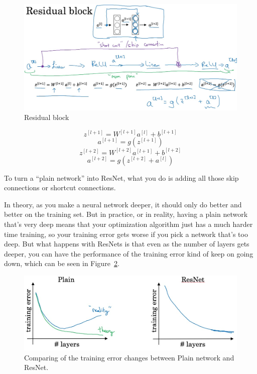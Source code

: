 \documentclass[UTF8]{article}
\newcommand{\Vector}[1]{\boldsymbol{\mathit{#1}}}   %
\newcommand{\Matrix}[1]{\boldsymbol{\mathit{#1}}}   %
\begin{document}
\begin{figure}[htb]
    \centering
    \includegraphics[width=40em]{figures/residual-block}
    \caption{Residual block}
    \label{fig:residual-block}
\end{figure}

$$ \Vector{z}^{[l+1]} = \Matrix{W}^{[l+1]} \Vector{a}^{[l]} + b^{[l+1]} $$
$$ \Vector{a}^{[l+1]} = g(\Vector{z^{[l+1]}}) $$
$$ \Vector{z}^{[l+2]} = \Matrix{W}^{[l+2]} \Vector{a}^{[l+1]} + b^{[l+2]} $$
$$ \Vector{a}^{[l+2]} = g(\Vector{z^{[l+2]}} + \Vector{a}^{[l]}) $$

To turn a ``plain network'' into ResNet, what you do is adding all those skip connections or
shortcut connections.

In theory, as you make a neural network deeper, it should only do better and better on the training
set. But in practice, or in reality, having a plain network that's very deep means that your
optimization algorithm just has a much harder time training, so your training error gets worse if
you pick a network that's too deep. But what happens with ResNets is that even as the number of
layers gets deeper, you can have the performance of the training error kind of keep on going down,
which can be seen in Figure~\ref{fig:plain-res-training-error-compare}.

\begin{figure}[htb]
    \centering
    \includegraphics[width=40em]{figures/plain-res-training-error-compare}
    \caption{Comparing of the training error changes between Plain network and ResNet.}
    \label{fig:plain-res-training-error-compare}
\end{figure}
\end{document}
